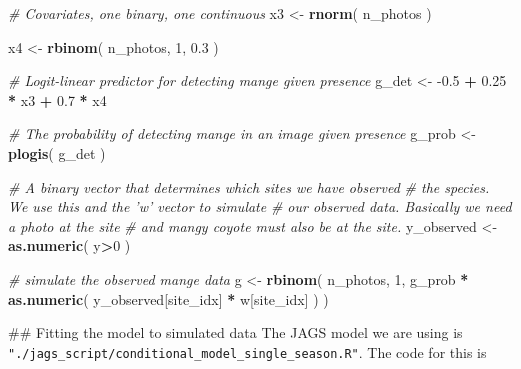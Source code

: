 \documentclass[
]{article}
\newenvironment{Shaded}{\begin{snugshade}}{\end{snugshade}}
\newcommand{\CommentTok}[1]{\textcolor[rgb]{0.56,0.35,0.01}{\textit{#1}}}
\newcommand{\DecValTok}[1]{\textcolor[rgb]{0.00,0.00,0.81}{#1}}
\newcommand{\FloatTok}[1]{\textcolor[rgb]{0.00,0.00,0.81}{#1}}
\newcommand{\KeywordTok}[1]{\textcolor[rgb]{0.13,0.29,0.53}{\textbf{#1}}}
\newcommand{\NormalTok}[1]{#1}
\newcommand{\OperatorTok}[1]{\textcolor[rgb]{0.81,0.36,0.00}{\textbf{#1}}}
\newcommand{\StringTok}[1]{\textcolor[rgb]{0.31,0.60,0.02}{#1}}
\begin{document}
\begin{Shaded}
\begin{Highlighting}[]
\CommentTok{# Covariates, one binary, one continuous}
\NormalTok{x3 <-}\StringTok{ }\KeywordTok{rnorm}\NormalTok{(}
\NormalTok{  n_photos}
\NormalTok{)}

\NormalTok{x4 <-}\StringTok{ }\KeywordTok{rbinom}\NormalTok{(}
\NormalTok{  n_photos,}
  \DecValTok{1}\NormalTok{,}
  \FloatTok{0.3}
\NormalTok{)}

\CommentTok{# Logit-linear predictor for detecting mange given presence}
\NormalTok{g_det <-}\StringTok{ }\FloatTok{-0.5} \OperatorTok{+}\StringTok{ }\FloatTok{0.25} \OperatorTok{*}\StringTok{ }\NormalTok{x3 }\OperatorTok{+}\StringTok{ }\FloatTok{0.7} \OperatorTok{*}\StringTok{ }\NormalTok{x4}

\CommentTok{# The probability of detecting mange in an image given presence}
\NormalTok{g_prob <-}\StringTok{ }\KeywordTok{plogis}\NormalTok{(}
\NormalTok{  g_det}
\NormalTok{)}

\CommentTok{# A binary vector that determines which sites we have observed}
\CommentTok{#  the species. We use this and the 'w' vector to simulate}
\CommentTok{#  our observed data. Basically we need a photo at the site}
\CommentTok{#  and mangy coyote must also be at the site.}
\NormalTok{y_observed <-}\StringTok{ }\KeywordTok{as.numeric}\NormalTok{(}
\NormalTok{  y}\OperatorTok{>}\DecValTok{0}
\NormalTok{)}

\CommentTok{# simulate the observed mange data}
\NormalTok{g <-}\StringTok{ }\KeywordTok{rbinom}\NormalTok{(}
\NormalTok{  n_photos,}
  \DecValTok{1}\NormalTok{,}
\NormalTok{  g_prob }\OperatorTok{*}\StringTok{ }\KeywordTok{as.numeric}\NormalTok{(}
\NormalTok{    y_observed[site_idx] }\OperatorTok{*}\StringTok{ }\NormalTok{w[site_idx]}
\NormalTok{  )}
\NormalTok{)}
\end{Highlighting}
\end{Shaded}

\#\# Fitting the model to simulated data The JAGS model we are using is
\texttt{"./jags\_script/conditional\_model\_single\_season.R"}. The code
for this is
\end{document}
